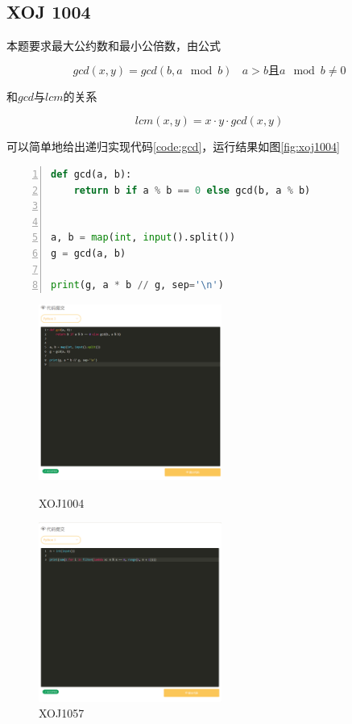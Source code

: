 \documentclass[a4paper,twoside]{article}
\begin{document}
\begin{spacing}{1.2}
\clearpage

\section{XOJ 1004}

本题要求最大公约数和最小公倍数，由公式

$$
gcd(x,y)=gcd(b,a\mod b) \ \ \ \ a>b\mbox{且}a\mod b \ne 0
$$

和$gcd$与$lcm$的关系

$$
lcm(x,y)=x \cdot y \cdot gcd(x,y)
$$

可以简单地给出递归实现代码\ref{code:gcd}，运行结果如图\ref{fig:xoj1004}

\begin{lstlisting}[language=Python,numbers=left,style=PythonStyle,caption=XOJ1004,label={code:gcd}]
def gcd(a, b):
	return b if a % b == 0 else gcd(b, a % b)


a, b = map(int, input().split())
g = gcd(a, b)

print(g, a * b // g, sep='\n')
\end{lstlisting}

\begin{figure}[htbp]
	\centering
	\begin{minipage}[t]{0.48\textwidth}
		\centering
		\includegraphics[width=6cm]{t1.png}
		\caption{XOJ1004}
		\label{fig:xoj1004}
	\end{minipage}
	\begin{minipage}[t]{0.48\textwidth}
		\centering
		\includegraphics[width=6cm]{t2.png}
		\caption{XOJ1057}
		\label{fig:xoj1057}
	\end{minipage}
\end{figure}



\end{spacing}
\end{document}
